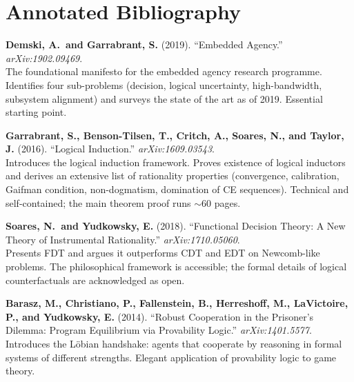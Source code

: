 \documentclass[11pt,a4paper]{article}
\theoremstyle{definition}
\theoremstyle{remark}
\begin{document}
\section{Annotated Bibliography}\label{sec:bibliography}

\begin{enumerate}[label={[\arabic*]},leftmargin=2em]

\item \label{bib:demski2019} \textbf{Demski, A.\ and Garrabrant, S.}
  (2019). ``Embedded Agency.'' \textit{arXiv:1902.09469}.\\
  The foundational manifesto for the embedded agency research programme.
  Identifies four sub-problems (decision, logical uncertainty,
  high-bandwidth, subsystem alignment) and surveys the state of the art
  as of 2019.  Essential starting point.

\item \label{bib:garrabrant2016} \textbf{Garrabrant, S., Benson-Tilsen,
  T., Critch, A., Soares, N., and Taylor, J.} (2016). ``Logical
  Induction.'' \textit{arXiv:1609.03543}.\\
  Introduces the logical induction framework.  Proves existence of
  logical inductors and derives an extensive list of rationality
  properties (convergence, calibration, Gaifman condition,
  non-dogmatism, domination of CE sequences).  Technical and
  self-contained; the main theorem proof runs $\sim$60 pages.

\item \label{bib:soares2018} \textbf{Soares, N.\ and Yudkowsky, E.}
  (2018). ``Functional Decision Theory: A New Theory of Instrumental
  Rationality.'' \textit{arXiv:1710.05060}.\\
  Presents FDT and argues it outperforms CDT and EDT on Newcomb-like
  problems.  The philosophical framework is accessible; the formal
  details of logical counterfactuals are acknowledged as open.

\item \label{bib:barasz2014} \textbf{Barasz, M., Christiano, P.,
  Fallenstein, B., Herreshoff, M., LaVictoire, P., and Yudkowsky, E.}
  (2014). ``Robust Cooperation in the Prisoner's Dilemma: Program
  Equilibrium via Provability Logic.'' \textit{arXiv:1401.5577}.\\
  Introduces the L\"obian handshake: agents that cooperate by reasoning
  in formal systems of different strengths.  Elegant application of
  provability logic to game theory.


\end{enumerate}
\end{document}
